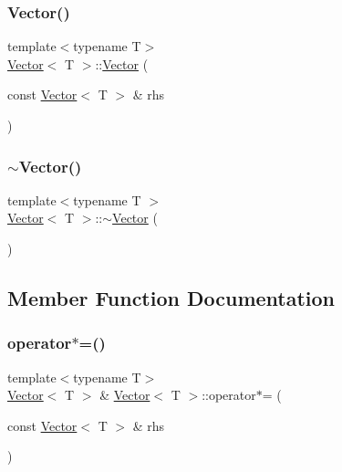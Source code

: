 \mbox{\label{classVector_ac71d98c4ac152523a76bbadcd3a83a5a_ac71d98c4ac152523a76bbadcd3a83a5a}} 
\subsubsection{\texorpdfstring{Vector()}{Vector()}\hspace{0.1cm}{\footnotesize\ttfamily [5/5]}}
{\footnotesize\ttfamily template$<$typename T$>$ \\
\mbox{\hyperlink{classVector}{Vector}}$<$ T $>$\+::\mbox{\hyperlink{classVector}{Vector}} (\begin{DoxyParamCaption}\item[{const \mbox{\hyperlink{classVector}{Vector}}$<$ T $>$ \&}]{rhs }\end{DoxyParamCaption})}

\mbox{\label{classVector_afd524fac19e6d3d69db5198ffe2952b0_afd524fac19e6d3d69db5198ffe2952b0}} 
\subsubsection{\texorpdfstring{$\sim$\+Vector()}{~Vector()}}
{\footnotesize\ttfamily template$<$typename T $>$ \\
\mbox{\hyperlink{classVector}{Vector}}$<$ T $>$\+::$\sim$\mbox{\hyperlink{classVector}{Vector}} (\begin{DoxyParamCaption}{ }\end{DoxyParamCaption})}



\subsection{Member Function Documentation}
\mbox{\label{classVector_a3b3e94a4ee6601a8c3ceaed790c2d965_a3b3e94a4ee6601a8c3ceaed790c2d965}} 
\subsubsection{\texorpdfstring{operator$\ast$=()}{operator*=()}\hspace{0.1cm}{\footnotesize\ttfamily [1/2]}}
{\footnotesize\ttfamily template$<$typename T$>$ \\
\mbox{\hyperlink{classVector}{Vector}}$<$ T $>$ \& \mbox{\hyperlink{classVector}{Vector}}$<$ T $>$\+::operator$\ast$= (\begin{DoxyParamCaption}\item[{const \mbox{\hyperlink{classVector}{Vector}}$<$ T $>$ \&}]{rhs }\end{DoxyParamCaption})\hspace{0.3cm}{\ttfamily [inline]}}

